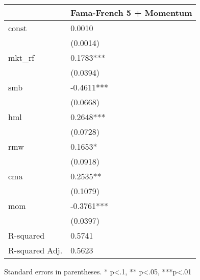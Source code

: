 \begin{table}
\caption{}
\label{}
\begin{center}
\begin{tabular}{ll}
\hline
               & Fama-French 5 + Momentum  \\
\hline
const          & 0.0010                    \\
               & (0.0014)                  \\
mkt\_rf        & 0.1783***                 \\
               & (0.0394)                  \\
smb            & -0.4611***                \\
               & (0.0668)                  \\
hml            & 0.2648***                 \\
               & (0.0728)                  \\
rmw            & 0.1653*                   \\
               & (0.0918)                  \\
cma            & 0.2535**                  \\
               & (0.1079)                  \\
mom            & -0.3761***                \\
               & (0.0397)                  \\
R-squared      & 0.5741                    \\
R-squared Adj. & 0.5623                    \\
\hline
\end{tabular}
\end{center}
\end{table}
\bigskip
Standard errors in parentheses. \newline 
* p<.1, ** p<.05, ***p<.01
